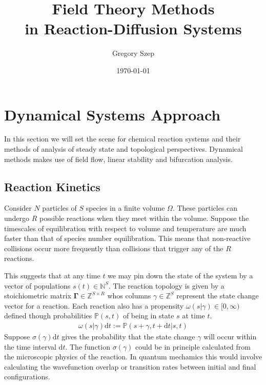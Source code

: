 \documentclass{article}[12pt]
\numberwithin{equation}{section}
\begin{document}
\title{
Field Theory Methods \\
in Reaction-Diffusion Systems
}

\author{Gregory Szep}
\date{\today}
\maketitle
\vspace{-25pt}
\section{Dynamical Systems Approach} \vspace{-10pt}
In this section we will set the scene for chemical reaction systems and their
methods of analysis of steady state and topological perspectives. Dynamical
methods makes use of field flow, linear stability and bifurcation analysis.

\subsection{Reaction Kinetics} \vspace{-10pt}
Consider $N$ particles of $S$ species in a finite volume $\Omega$. These particles
can undergo $R$ possible reactions when they meet within the volume. Suppose the
timescales of equilibration with respect to volume and temperature are much faster
than that of species number equilibration. This means that non-reactive collisions
occur more frequently than collisions that trigger any of the $R$ reactions.

This suggests that at any time $t$ we may pin down the state of the system by a
vector of populations $s(t)\in\mathbb{N}^S$. The reaction topology is given by
a stoichiometric matrix $\mathbf{\Gamma}\in\mathbb{Z}^{S\times R}$ whos columns
$\gamma\in\mathbb{Z}^{S}$ represent the state change vector for a reaction. Each
reaction also has a propensity $\omega(s|\gamma)\in[0,\infty)$ defined though
probabilities $\mathbb{P}(s,t)$ of being in state $s$ at time $t$.
\begin{align}
	\omega(s|\gamma)\mathrm{d}t := \mathbb{P}(s+\gamma,t+\mathrm{d}t|s,t)
	\label{eq:fundamentalpremise}
\end{align}
Suppose $\sigma(\gamma)\mathrm{d}t$ gives the probability that the state change
$\gamma$ will occur within the time interval $\mathrm{d}t$. The function $\sigma(\gamma)$
could be in principle calculated from the microscopic physics of the reaction.
In quantum mechamics this would involve calculating the wavefunction overlap
or transition rates between initial and final configurations.
\end{document}
